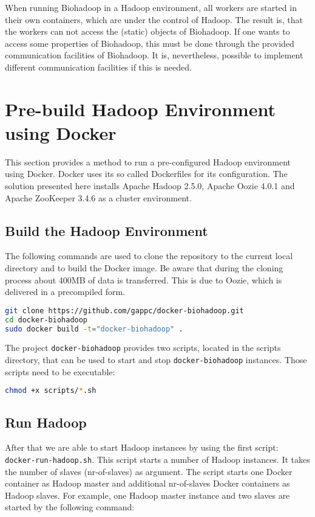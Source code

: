 When running Biohadoop in a Hadoop environment, all workers are started in their own containers, which are under the control of Hadoop. The result is, that the workers can not access the (static) objects of Biohadoop. If one wants to access some properties of Biohadoop, this must be done through the provided communication facilities of Biohadoop. It is, nevertheless, possible to implement different communication facilities if this is needed.

\section{Pre-build Hadoop Environment using Docker}
\label{chap:appendix:biohadoop-docker}
This section provides a method to run a pre-configured Hadoop environment using Docker. Docker uses its so called Dockerfiles for its configuration. The solution presented here installs Apache Hadoop 2.5.0, Apache Oozie 4.0.1 and Apache ZooKeeper 3.4.6 as a cluster environment.

\subsection{Build the Hadoop Environment}
The following commands are used to clone the repository to the current local directory and to build the Docker image. Be aware that during the cloning process about 400MB of data is transferred. This is due to Oozie, which is delivered in a precompiled form.
\begin{lstlisting}[language=bash]
git clone https://github.com/gappc/docker-biohadoop.git
cd docker-biohadoop
sudo docker build -t="docker-biohadoop" .
\end{lstlisting}

The project \texttt{docker-biohadoop} provides two scripts, located in the scripts directory, that can be used to start and stop \texttt{docker-biohadoop} instances. Those scripts need to be executable:

\begin{lstlisting}[language=bash]
chmod +x scripts/*.sh
\end{lstlisting}

\subsection{Run Hadoop}
After that we are able to start Hadoop instances by using the first script: \texttt{docker-run-hadoop.sh}. This script starts a number of Hadoop instances. It takes the number of slaves (nr-of-slaves) as argument. The script starts one Docker container as Hadoop master and additional nr-of-slaves Docker containers as Hadoop slaves. For example, one Hadoop master instance and two slaves are started by the following command:


